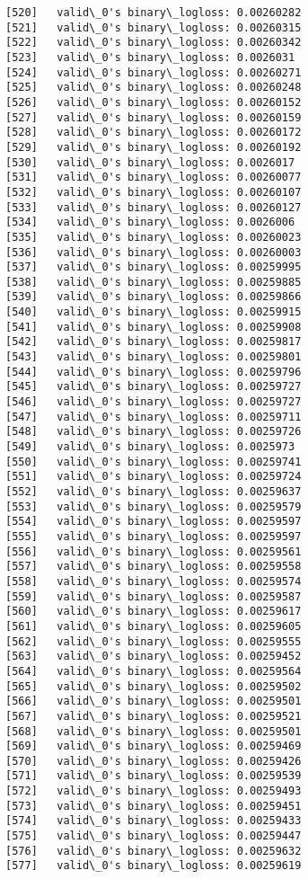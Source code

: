 \documentclass[11pt]{article}
\begin{document}
\begin{Verbatim}[commandchars=\\\{\}]
[520]	valid\_0's binary\_logloss: 0.00260282
[521]	valid\_0's binary\_logloss: 0.00260315
[522]	valid\_0's binary\_logloss: 0.00260342
[523]	valid\_0's binary\_logloss: 0.0026031
[524]	valid\_0's binary\_logloss: 0.00260271
[525]	valid\_0's binary\_logloss: 0.00260248
[526]	valid\_0's binary\_logloss: 0.00260152
[527]	valid\_0's binary\_logloss: 0.00260159
[528]	valid\_0's binary\_logloss: 0.00260172
[529]	valid\_0's binary\_logloss: 0.00260192
[530]	valid\_0's binary\_logloss: 0.0026017
[531]	valid\_0's binary\_logloss: 0.00260077
[532]	valid\_0's binary\_logloss: 0.00260107
[533]	valid\_0's binary\_logloss: 0.00260127
[534]	valid\_0's binary\_logloss: 0.0026006
[535]	valid\_0's binary\_logloss: 0.00260023
[536]	valid\_0's binary\_logloss: 0.00260003
[537]	valid\_0's binary\_logloss: 0.00259995
[538]	valid\_0's binary\_logloss: 0.00259885
[539]	valid\_0's binary\_logloss: 0.00259866
[540]	valid\_0's binary\_logloss: 0.00259915
[541]	valid\_0's binary\_logloss: 0.00259908
[542]	valid\_0's binary\_logloss: 0.00259817
[543]	valid\_0's binary\_logloss: 0.00259801
[544]	valid\_0's binary\_logloss: 0.00259796
[545]	valid\_0's binary\_logloss: 0.00259727
[546]	valid\_0's binary\_logloss: 0.00259727
[547]	valid\_0's binary\_logloss: 0.00259711
[548]	valid\_0's binary\_logloss: 0.00259726
[549]	valid\_0's binary\_logloss: 0.0025973
[550]	valid\_0's binary\_logloss: 0.00259741
[551]	valid\_0's binary\_logloss: 0.00259724
[552]	valid\_0's binary\_logloss: 0.00259637
[553]	valid\_0's binary\_logloss: 0.00259579
[554]	valid\_0's binary\_logloss: 0.00259597
[555]	valid\_0's binary\_logloss: 0.00259597
[556]	valid\_0's binary\_logloss: 0.00259561
[557]	valid\_0's binary\_logloss: 0.00259558
[558]	valid\_0's binary\_logloss: 0.00259574
[559]	valid\_0's binary\_logloss: 0.00259587
[560]	valid\_0's binary\_logloss: 0.00259617
[561]	valid\_0's binary\_logloss: 0.00259605
[562]	valid\_0's binary\_logloss: 0.00259555
[563]	valid\_0's binary\_logloss: 0.00259452
[564]	valid\_0's binary\_logloss: 0.00259564
[565]	valid\_0's binary\_logloss: 0.00259502
[566]	valid\_0's binary\_logloss: 0.00259501
[567]	valid\_0's binary\_logloss: 0.00259521
[568]	valid\_0's binary\_logloss: 0.00259501
[569]	valid\_0's binary\_logloss: 0.00259469
[570]	valid\_0's binary\_logloss: 0.00259426
[571]	valid\_0's binary\_logloss: 0.00259539
[572]	valid\_0's binary\_logloss: 0.00259493
[573]	valid\_0's binary\_logloss: 0.00259451
[574]	valid\_0's binary\_logloss: 0.00259433
[575]	valid\_0's binary\_logloss: 0.00259447
[576]	valid\_0's binary\_logloss: 0.00259632
[577]	valid\_0's binary\_logloss: 0.00259619

\end{Verbatim}
\end{document}
